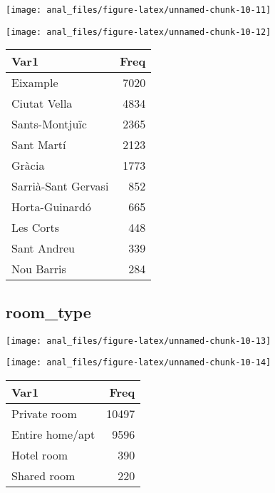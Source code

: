 \begin{center}\texttt{[image: anal\_files/figure-latex/unnamed-chunk-10-11]} \end{center}

\begin{center}\texttt{[image: anal\_files/figure-latex/unnamed-chunk-10-12]} \end{center}

\begin{table}[H]
\centering
\begin{tabular}[t]{lr}
\toprule
Var1 & Freq\\
\midrule
Eixample & 7020\\
Ciutat Vella & 4834\\
Sants-Montjuïc & 2365\\
Sant Martí & 2123\\
Gràcia & 1773\\
\addlinespace
Sarrià-Sant Gervasi & 852\\
Horta-Guinardó & 665\\
Les Corts & 448\\
Sant Andreu & 339\\
Nou Barris & 284\\
\bottomrule
\end{tabular}
\end{table}
\pagebreak

\hypertarget{room_type}{%
\subsection{room\_type}\label{room_type}}

\begin{center}\texttt{[image: anal\_files/figure-latex/unnamed-chunk-10-13]} \end{center}

\begin{center}\texttt{[image: anal\_files/figure-latex/unnamed-chunk-10-14]} \end{center}

\begin{table}[H]
\centering
\begin{tabular}[t]{lr}
\toprule
Var1 & Freq\\
\midrule
Private room & 10497\\
Entire home/apt & 9596\\
Hotel room & 390\\
Shared room & 220\\
\bottomrule
\end{tabular}
\end{table}
\pagebreak

